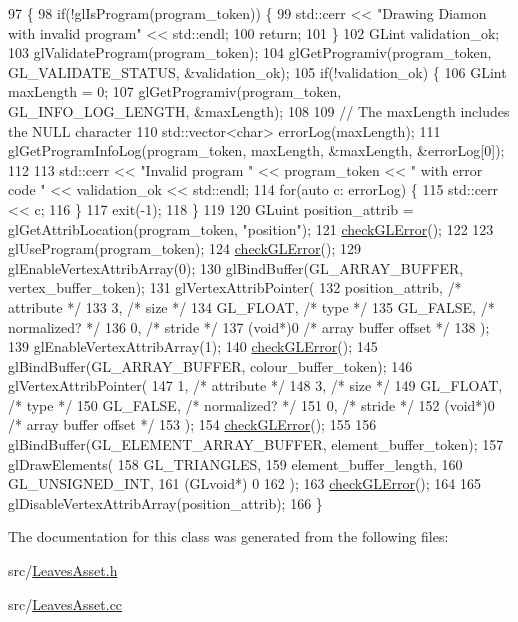 \begin{DoxyCode}
97                                            \{
98   \textcolor{keywordflow}{if}(!glIsProgram(program\_token)) \{
99     std::cerr << \textcolor{stringliteral}{"Drawing Diamon with invalid program"} << std::endl;
100     \textcolor{keywordflow}{return};
101   \}
102   GLint validation\_ok;
103   glValidateProgram(program\_token);
104   glGetProgramiv(program\_token, GL\_VALIDATE\_STATUS, &validation\_ok);
105   \textcolor{keywordflow}{if}(!validation\_ok) \{
106     GLint maxLength = 0;
107     glGetProgramiv(program\_token, GL\_INFO\_LOG\_LENGTH, &maxLength);
108 
109     \textcolor{comment}{// The maxLength includes the NULL character}
110     std::vector<char> errorLog(maxLength);
111     glGetProgramInfoLog(program\_token, maxLength, &maxLength, &errorLog[0]);
112 
113     std::cerr << \textcolor{stringliteral}{"Invalid program "} << program\_token << \textcolor{stringliteral}{" with error code "} << validation\_ok << std::endl;
114     \textcolor{keywordflow}{for}(\textcolor{keyword}{auto} c: errorLog) \{
115       std::cerr << c;
116     \}
117     exit(-1);
118   \}
119 
120   GLuint position\_attrib = glGetAttribLocation(program\_token, \textcolor{stringliteral}{"position"});
121   \hyperlink{LeavesAsset_8cc_a75f201b0e53e68726854997957322b8d}{checkGLError}();
122 
123   glUseProgram(program\_token);
124   \hyperlink{LeavesAsset_8cc_a75f201b0e53e68726854997957322b8d}{checkGLError}();
129   glEnableVertexAttribArray(0);
130   glBindBuffer(GL\_ARRAY\_BUFFER, vertex\_buffer\_token);
131   glVertexAttribPointer(
132     position\_attrib,        \textcolor{comment}{/* attribute */}
133     3,        \textcolor{comment}{/* size */}
134     GL\_FLOAT,   \textcolor{comment}{/* type */}
135     GL\_FALSE,   \textcolor{comment}{/* normalized? */}
136     0,        \textcolor{comment}{/* stride */}
137     (\textcolor{keywordtype}{void}*)0    \textcolor{comment}{/* array buffer offset */}
138   );
139   glEnableVertexAttribArray(1);
140   \hyperlink{LeavesAsset_8cc_a75f201b0e53e68726854997957322b8d}{checkGLError}();
145   glBindBuffer(GL\_ARRAY\_BUFFER, colour\_buffer\_token);
146   glVertexAttribPointer(
147     1,        \textcolor{comment}{/* attribute */}
148     3,        \textcolor{comment}{/* size */}
149     GL\_FLOAT,   \textcolor{comment}{/* type */}
150     GL\_FALSE,   \textcolor{comment}{/* normalized? */}
151     0,        \textcolor{comment}{/* stride */}
152     (\textcolor{keywordtype}{void}*)0    \textcolor{comment}{/* array buffer offset */}
153   );
154   \hyperlink{LeavesAsset_8cc_a75f201b0e53e68726854997957322b8d}{checkGLError}();
155 
156   glBindBuffer(GL\_ELEMENT\_ARRAY\_BUFFER, element\_buffer\_token);
157   glDrawElements(
158     GL\_TRIANGLES,
159     element\_buffer\_length,
160     GL\_UNSIGNED\_INT,
161     (GLvoid*) 0
162   );
163   \hyperlink{LeavesAsset_8cc_a75f201b0e53e68726854997957322b8d}{checkGLError}();
164 
165   glDisableVertexAttribArray(position\_attrib);
166 \}
\end{DoxyCode}


The documentation for this class was generated from the following files\+:\begin{DoxyCompactItemize}
\item 
src/\hyperlink{LeavesAsset_8h}{Leaves\+Asset.\+h}\item 
src/\hyperlink{LeavesAsset_8cc}{Leaves\+Asset.\+cc}\end{DoxyCompactItemize}
